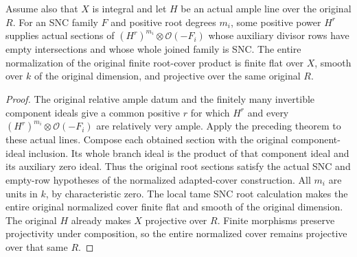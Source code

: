 \begin{theorem}
\label{thm:kn-relative-nadel-cover-geometry}
\leanok
{}
Assume also that $X$ is integral and let $H$ be an actual ample line
over the original $R$.  For an SNC family $F$ and positive root degrees
$m_i$, some positive power $H^r$ supplies actual sections of
$(H^r)^{m_i}\otimes\mathcal O(-F_i)$ whose auxiliary divisor rows have
empty intersections and whose whole joined family is SNC.  The entire
normalization of the original finite root-cover product is finite flat
over $X$, smooth over $k$ of the original dimension, and projective over
the same original $R$.
\end{theorem}
\begin{proof}
The original relative ample datum and the finitely many invertible
component ideals give a common positive $r$ for which $H^r$ and every
$(H^r)^{m_i}\otimes\mathcal O(-F_i)$ are relatively very ample.  Apply
the preceding theorem to these actual lines.  Compose each obtained
section with the original component-ideal inclusion.  Its whole branch
ideal is the product of that component ideal and its auxiliary zero
ideal.  Thus the original root sections satisfy the actual SNC and
empty-row hypotheses of the normalized adapted-cover construction.
All $m_i$ are units in $k$, by characteristic zero.  The local tame SNC
root calculation makes the entire original normalized cover finite
flat and smooth of the original dimension.  The original $H$ already
makes $X$ projective over $R$.  Finite morphisms preserve projectivity
under composition, so the entire normalized cover remains projective
over that same $R$.
\end{proof}

